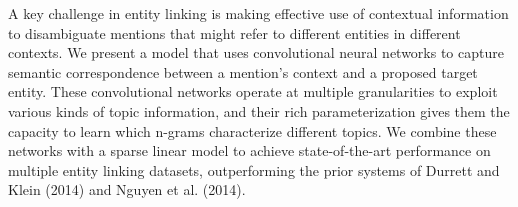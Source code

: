 A key challenge in entity linking is making effective use of contextual information to disambiguate mentions that might refer to different entities in different contexts. We present a model that uses convolutional neural networks to capture semantic correspondence between a mention's context and a proposed target entity. These convolutional networks operate at multiple granularities to exploit various kinds of topic information, and their rich parameterization gives them the capacity to learn which n-grams characterize different topics. We combine these networks with a sparse linear model to achieve state-of-the-art performance on multiple entity linking datasets, outperforming the prior systems of Durrett and Klein (2014) and Nguyen et al. (2014).
